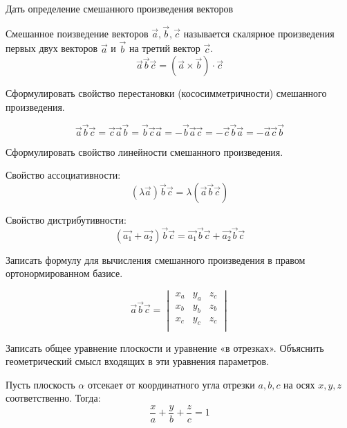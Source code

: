 \begin{question}
  Дать определение смешанного произведения векторов
\end{question}
\begin{answer}
  Смешанное поизведение векторов $\vec{a}, \vec{b}, \vec{c}$ называется скалярное произведения первых двух векторов $\vec{a}$ и $\vec{b}$ на третий вектор $\vec{c}$. \[
  \vec{a} \vec{b} \vec{c} = (\vec{a} \times \vec{b}) \cdot \vec{c}
  \] 
\end{answer}

\begin{question}
  Сформулировать свойство перестановки (кососимметричности) смешанного произведения.
\end{question}
\begin{answer}
  \[
  \vec{a} \vec{b} \vec{c} = \vec{c} \vec{a} \vec{b} = \vec{b} \vec{c} \vec{a} = -\vec{b} \vec{a} \vec{c} = - \vec{c} \vec{b} \vec{a} = - \vec{a} \vec{c} \vec{b}
  \] 
\end{answer}

\begin{question}
  Сформулировать свойство линейности смешанного произведения.
\end{question}
\begin{answer}
  Свойство ассоциативности: \[
    (\lambda \vec{a}) \vec{b} \vec{c} = \lambda (\vec{a} \vec{b} \vec{c})
  \] 

  Свойство дистрибутивности: \[
      (\vec{a_1} + \vec{a_2}) \vec{b} \vec{c} = \vec{a_1} \vec{b} \vec{c} + \vec{a_2} \vec{b} \vec{c}
  \]
\end{answer}


\begin{question}
  Записать формулу для вычисления смешанного произведения в правом ортонормированном базисе.
\end{question}
\begin{answer}
  \[
  \vec{a} \vec{b} \vec{c} =
    \begin{vmatrix}
      x_a & y_a & z_c \\
      x_b & y_b & z_b \\
      x_c & y_c & z_c \\
    \end{vmatrix}
  \]
\end{answer}

\begin{question}
  Записать общее уравнение плоскости и уравнение «в отрезках». Объяснить геометрический смысл входящих в эти уравнения параметров.
\end{question}
\begin{answer}
  Пусть плоскость $\alpha$ отсекает от координатного угла отрезки $a, b, c$ на осях  $x, y, z$ соответственно. Тогда: \[
    \frac{x}{a} + \frac{y}{b} + \frac{z}{c} = 1
  \] 
\end{answer}

